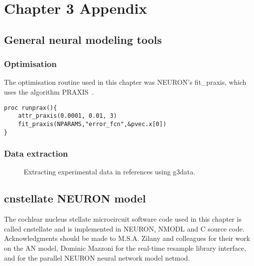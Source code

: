 
\section{Chapter 3 Appendix    \label{sec:ch3:appendix}}

\subsection{General neural modeling tools}

\subsubsection{Optimisation}

The optimisation routine used in this chapter was NEURON's \textsf{fit\_praxis},
which uses the algorithm PRAXIS~\citep{Brent:1976}.

\begin{lstlisting}[label=lbl:runprax,caption=Set optimisation attributes and run
  fitting procedure.]
  proc runprax(){
    attr_praxis(0.0001, 0.01, 3)
    fit_praxis(NPARAMS,"error_fcn",&pvec.x[0])
}
\end{lstlisting}


\subsubsection{Data extraction    \label{sec:data-extraction}}


\begin{figure}[htb]
  \begin{center}
    \caption{Extracting experimental data in references using g3data.}
    \label{fig:Extractdata}
  \end{center}
\end{figure}


\subsection{\textsf{cnstellate} NEURON model    \label{sec:cnstellate-neur-model}}

The cochlear nucleus stellate microcircuit software code used in this chapter is
called \textsf{cnstellate} and is implemented in NEURON, NMODL and C source
code. Acknowledgments should be made to M.S.A. Zilany and colleagues for their
work on the AN model, Dominic Mazzoni for the real-time resample library
interface, and \citet{MiglioreCanniaEtAl:2006} for the parallel NEURON neural
network model \textsf{netmod}.

